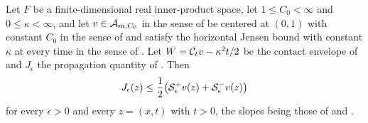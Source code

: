 \begin{lemma}
Let $F$ be a finite-dimensional real inner-product space, let
$1\le C_0<\infty$ and $0\le\kappa<\infty$, and let $v\in\mathcal{A}_{m,C_0}$ in the
sense of  be centered at $(0,1)$ with constant $C_0$ in the
sense of  and satisfy the horizontal Jensen bound with
constant $\kappa$ at every time in the sense of . Let
$W=\mathcal{C}_tv-\kappa^2t/2$ be the contact envelope of  and
$J_\epsilon$ the propagation quantity of . Then
\begin{equation}\label{eq:dp-J-bounds}
  J_\epsilon(z)\le
  \frac12\bigl(\mathcal{S}^+_\epsilon v(z)+\mathcal{S}^-_\epsilon v(z)\bigr)
\end{equation}
for every $\epsilon>0$ and every $z=(x,t)$ with $t>0$, the slopes being those of
 and .
\end{lemma}
